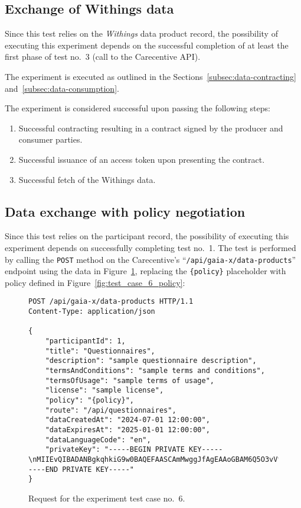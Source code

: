 \subsection{Exchange of Withings data}\label{subsec:exchange-of-withings-data}

Since this test relies on the \textit{Withings} data product record, the possibility of executing this experiment depends on the successful completion of at least the first phase of test no.~3 (call to the Carecentive API).

The experiment is executed as outlined in the Sections~\ref{subsec:data-contracting} and~\ref{subsec:data-consumption}.

The experiment is considered successful upon passing the following steps:
\begin{enumerate}
    \item Successful contracting resulting in a contract signed by the producer and consumer parties.
    \item Successful issuance of an access token upon presenting the contract.
    \item Successful fetch of the Withings data.
\end{enumerate}

\subsection{Data exchange with policy negotiation}\label{subsec:data-exchange-with-policy-negotiation}

Since this test relies on the participant record, the possibility of executing this experiment depends on successfully completing test no.~1.
The test is performed by calling the \texttt{POST} method on the Carecentive's ``\texttt{/api/gaia-x/data-products}'' endpoint using the data in Figure~\ref{fig:test_case_6}, replacing the \texttt{\{policy\}} placeholder with policy defined in Figure~\ref{fig:test_case_6_policy}:

\begin{figure}[h]
    \centering
    \begin{verbatim}
POST /api/gaia-x/data-products HTTP/1.1
Content-Type: application/json

{
    "participantId": 1,
	"title": "Questionnaires",
	"description": "sample questionnaire description",
	"termsAndConditions": "sample terms and conditions",
	"termsOfUsage": "sample terms of usage",
	"license": "sample license",
	"policy": "{policy}",
	"route": "/api/questionnaires",
	"dataCreatedAt": "2024-07-01 12:00:00",
	"dataExpiresAt": "2025-01-01 12:00:00",
	"dataLanguageCode": "en",
	"privateKey": "-----BEGIN PRIVATE KEY-----\nMIIEvQIBADANBgkqhkiG9w0BAQEFAASCAmMwggJfAgEAAoGBAM6Q5O3vVfnxk6P7\n...\nYWw+HiFJh9XQpRUtv9PV8L8AqFFfMdsOpT6pgC+aA/WB\n-----END PRIVATE KEY-----"
}
    \end{verbatim}
    \caption{Request for the experiment test case no.~6.}\label{fig:test_case_6}
\end{figure}

